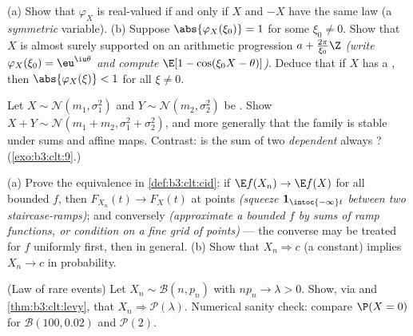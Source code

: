 \begin{exercise}[$\star\star$]\label{exo:b3:clt:2}
(a) Show that $\varphi_X$ is real-valued if and only if $X$
and $-X$ have the same law (a \emph{symmetric} variable).
(b) Suppose $\abs{\varphi_X(\xi_0)} = 1$ for some $\xi_0 \neq
0$. Show that $X$ is almost surely supported on an arithmetic
progression $a + \frac{2\pi}{\xi_0}\Z$ \emph{(write
$\varphi_X(\xi_0) = \eu^{\iu\theta}$ and compute $\E[1 -
\cos(\xi_0X - \theta)]$)}. Deduce that if $X$ has a ,
then $\abs{\varphi_X(\xi)} < 1$ for all $\xi \neq 0$.
\end{exercise}

\begin{exercise}[$\star\star$]\label{exo:b3:clt:3}
Let $X \sim \mathcal N(m_1, \sigma_1^2)$ and $Y \sim
\mathcal N(m_2, \sigma_2^2)$ be . Show $X + Y
\sim \mathcal N(m_1 + m_2, \sigma_1^2 + \sigma_2^2)$, and
more generally that the  family is stable under
 sums and affine maps. Contrast: is the sum of
two \emph{dependent}  always ?
(\cref{exo:b3:clt:9}.)
\end{exercise}

\begin{exercise}[$\star\star$]\label{exo:b3:clt:4}
(a) Prove the equivalence in \cref{def:b3:clt:cid}: if
$\E f(X_n) \to \E f(X)$ for all bounded  $f$,
then $F_{X_n}(t) \to F_X(t)$ at  points
\emph{(squeeze $\mathbf 1_{\intoc{-\infty}t}$ between two
 staircase-ramps)}; and conversely
\emph{(approximate a bounded  $f$ by sums of ramp
functions, or condition on a fine grid of 
points)} --- the converse may be treated for $f$ uniformly
 first, then in general.
(b) Show that $X_n \Rightarrow c$ (a constant) implies $X_n
\to c$ in probability.
\end{exercise}

\begin{exercise}[$\star\star$]\label{exo:b3:clt:5}
(Law of rare events) Let $X_n \sim \mathcal B(n, p_n)$ with
$np_n \to \lambda > 0$. Show, via 
and \cref{thm:b3:clt:levy}, that $X_n \Rightarrow \mathcal
P(\lambda)$. Numerical sanity check: compare $\P(X = 0)$ for
$\mathcal B(100, 0.02)$ and $\mathcal P(2)$.
\end{exercise}

